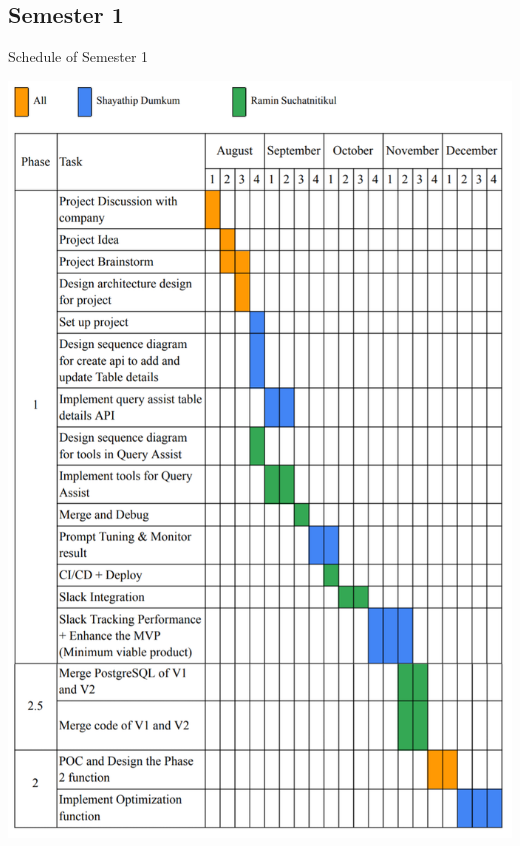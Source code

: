     \subsection{Semester 1}
    \begin{table}[H]
        \centering
        \caption{Schedule of Semester 1}\label{tbl:schedule}
        \includegraphics[width=15cm]{chapters/1/figures/plan.png}
    \end{table}

